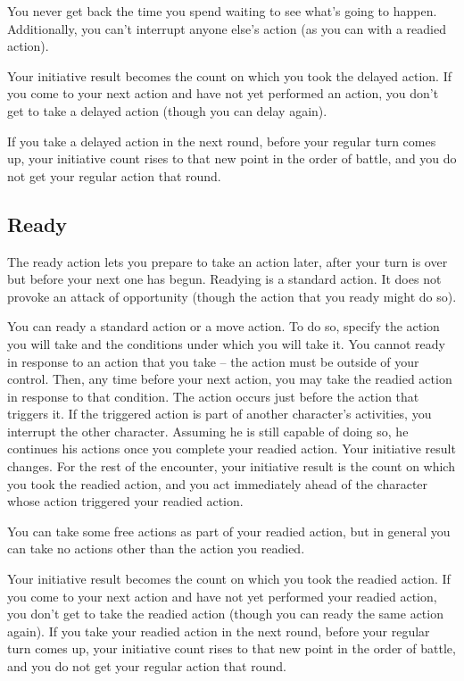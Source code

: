 You never get back the time you spend waiting to see what's going to happen. Additionally, you can't interrupt anyone else's action (as you can with a readied action).

 Your initiative result becomes the count on which you took the delayed action. If you come to your next action and have not yet performed an action, you don't get to take a delayed action (though you can delay again).

If you take a delayed action in the next round, before your regular turn comes up, your initiative count rises to that new point in the order of battle, and you do not get your regular action that round.

\subsection{Ready}
The ready action lets you prepare to take an action later, after your turn is over but before your next one has begun. Readying is a standard action. It does not provoke an attack of opportunity (though the action that you ready might do so).

 You can ready a standard action or a move action. To do so, specify the action you will take and the conditions under which you will take it. You cannot ready in response to an action that you take -- the action must be outside of your control. Then, any time before your next action, you may take the readied action in response to that condition. The action occurs just before the action that triggers it. If the triggered action is part of another character's activities, you interrupt the other character. Assuming he is still capable of doing so, he continues his actions once you complete your readied action. Your initiative result changes. For the rest of the encounter, your initiative result is the count on which you took the readied action, and you act immediately ahead of the character whose action triggered your readied action.

You can take some free actions as part of your readied action, but in general you can take no actions other than the action you readied.

 Your initiative result becomes the count on which you took the readied action. If you come to your next action and have not yet performed your readied action, you don't get to take the readied action (though you can ready the same action again). If you take your readied action in the next round, before your regular turn comes up, your initiative count rises to that new point in the order of battle, and you do not get your regular action that round.


